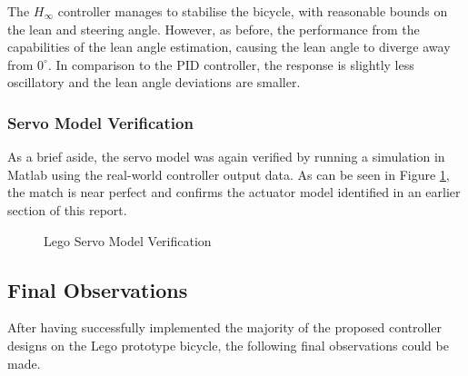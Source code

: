 The $H_{\infty}$ controller manages to stabilise the bicycle, with reasonable bounds on the lean and steering angle. However, as before, the performance from the capabilities of the lean angle estimation, causing the lean angle to diverge away from $0^{\circ}$. In comparison to the PID controller, the response is slightly less oscillatory and the lean angle deviations are smaller.

\subsubsection{Servo Model Verification}
As a brief aside, the servo model was again verified by running a simulation in Matlab using the real-world controller output data. As can be seen in Figure \ref{fig:LegoServoIDPart2}, the match is near perfect and confirms the actuator model identified in an earlier section of this report. \\

\begin{figure}[H]
\centering
{}
	\caption{Lego Servo Model Verification}
	\label{fig:LegoServoIDPart2}
\end{figure}

\subsection{Final Observations}
After having successfully implemented the majority of the proposed controller designs on the Lego prototype bicycle, the following final observations could be made.

